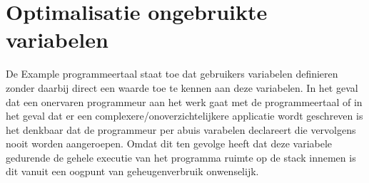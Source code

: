 \section{Optimalisatie ongebruikte variabelen}
De Example programmeertaal staat toe dat gebruikers variabelen definieren zonder daarbij direct een waarde toe te kennen aan deze variabelen. In het geval dat een onervaren programmeur aan het werk gaat met de programmeertaal of in het geval dat er een complexere/onoverzichtelijkere applicatie wordt geschreven is het denkbaar dat de programmeur per abuis varabelen declareert die vervolgens nooit worden aangeroepen. Omdat dit ten gevolge heeft dat deze variabele gedurende de gehele executie van het programma ruimte op de stack innemen is dit vanuit een oogpunt van geheugenverbruik onwenselijk.\\


